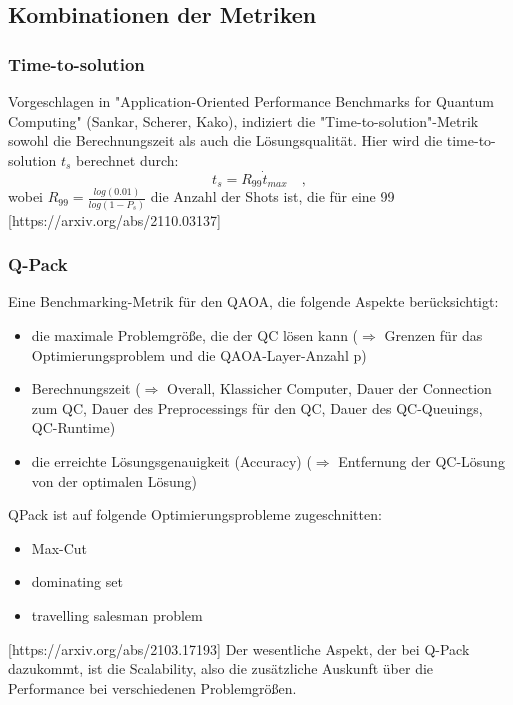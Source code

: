 \subsection{Kombinationen der Metriken}

\subsubsection{Time-to-solution}
Vorgeschlagen in "Application-Oriented Performance Benchmarks for Quantum Computing" (Sankar, Scherer, Kako), indiziert die "Time-to-solution"-Metrik
sowohl die Berechnungszeit als auch die Lösungsqualität.
Hier wird die time-to-solution $ t_{s} $ berechnet durch:
\begin{equation}
	t_{s} = R_{99} \dot t_{max} \quad ,
\end{equation}
wobei $ R_{99} = \frac{log(0.01)}{log(1-P_{s})} $ die Anzahl der Shots ist, die für eine 99%
[https://arxiv.org/abs/2110.03137]

\subsubsection{Q-Pack}
Eine Benchmarking-Metrik für den QAOA, die folgende Aspekte berücksichtigt:
\begin{itemize}
	\item die maximale Problemgröße, die der QC lösen kann ($\Rightarrow$ Grenzen für das Optimierungsproblem und die QAOA-Layer-Anzahl p)
	\item Berechnungszeit ($\Rightarrow$ Overall, Klassicher Computer, Dauer der Connection zum QC, Dauer des Preprocessings für den QC, Dauer des QC-Queuings, QC-Runtime)
	\item die erreichte Lösungsgenauigkeit (Accuracy) ($\Rightarrow$ Entfernung der QC-Lösung von der optimalen Lösung)
\end{itemize}
QPack ist auf folgende Optimierungsprobleme zugeschnitten:
\begin{itemize}
	\item Max-Cut
	\item dominating set
	\item travelling salesman problem
\end{itemize}
[https://arxiv.org/abs/2103.17193]
Der wesentliche Aspekt, der bei Q-Pack dazukommt, ist die Scalability, also die zusätzliche Auskunft über die Performance bei verschiedenen Problemgrößen.


